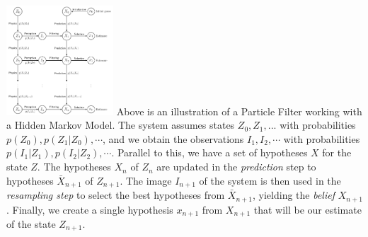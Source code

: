 \includegraphics[width=0.3\textwidth]{figures/hmm-graph/hmm-graph.pdf}
Above is an illustration of a Particle Filter working with a Hidden Markov Model. The system assumes states $Z_0, Z_1, ...$ with probabilities $p(Z_0), p(Z_1|Z_0), \cdots$, and we obtain the observations $I_1, I_2, \cdots$ with probabilities $p(I_1|Z_1), p(I_2|Z_2), \cdots$. Parallel to this, we have a set of hypotheses $X$ for the state $Z$. The hypotheses $X_n$ of $Z_n$ are updated in the \emph{prediction} step to hypotheses $\bar{X}_{n+1}$ of $Z_{n+1}$. The image $I_{n+1}$ of the system is then used in the \emph{resampling step} to select the best hypotheses from $\bar{X}_{n+1}$, yielding the \emph{belief} $X_{n+1}$. Finally, we create a single hypothesis $x_{n+1}$ from $X_{n+1}$ that will be our estimate of the state $Z_{n+1}$.
